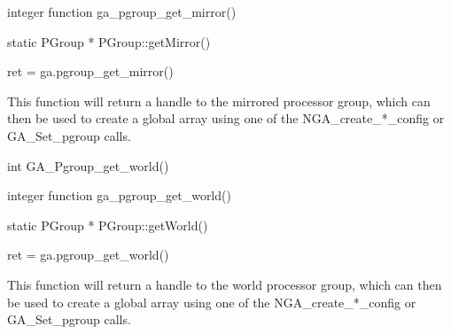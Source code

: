 \documentclass[12pt]{article}
\begin{document}
\begin{fapi}
\begin{fcode}
integer function ga_pgroup_get_mirror()
\end{fcode}
\end{fapi}

\begin{cxxapi}
\begin{cxxcode}
static PGroup * PGroup::getMirror()
\end{cxxcode}
\end{cxxapi}

\begin{pyapi}
\begin{pycode}
ret = ga.pgroup_get_mirror()
\end{pycode}
\end{pyapi}

\local

\begin{desc}
This function will return a handle to the mirrored processor group, which can
then be used to create a global array using one of the NGA_create_*_config or
GA_Set_pgroup calls.
\end{desc}


\begin{capi}
\begin{ccode}
int GA_Pgroup_get_world()
\end{ccode}
\end{capi}

\begin{fapi}
\begin{fcode}
integer function ga_pgroup_get_world()
\end{fcode}
\end{fapi}

\begin{cxxapi}
\begin{cxxcode}
static PGroup * PGroup::getWorld()
\end{cxxcode}
\end{cxxapi}

\begin{pyapi}
\begin{pycode}
ret = ga.pgroup_get_world()
\end{pycode}
\end{pyapi}

\local

\begin{desc}
This function will return a handle to the world processor group, which can then
be used to create a global array using one of the NGA_create_*_config or
GA_Set_pgroup calls.
\end{desc}
\end{document}
